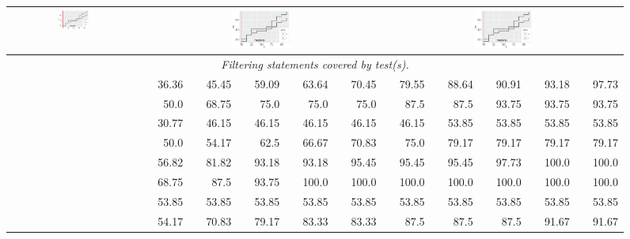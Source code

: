 \documentclass[sigplan,10pt,review,anonymous]{acmart}\settopmatter{printfolios=true,printccs=false,printacmref=false}
\begin{document}
\begin{figure}[!ht]
\begin{tabular}{cl|rrrrrrrrrr}
      \multicolumn{2}{c}{\includegraphics[width=0.25\textwidth]{R/mockito-allfailingtest.pdf}}
      &
      \multicolumn{5}{c}{\includegraphics[width=0.25\textwidth]{R/mockito-allfailingtest.pdf}}
      &
      \multicolumn{5}{c}{\includegraphics[width=0.25\textwidth]{R/mockito-allfailingtest.pdf}}\\
      \midrule

      \multicolumn{12}{c}{\emph{Filtering statements covered by test(s).}}\\
      \midrule
      \parbox[t]{2mm}{}
      & \lang{}     & 36.36 & 45.45 & 59.09 & 63.64 & 70.45  & 79.55 & 88.64 & 90.91 & 93.18 & 97.73 \\
      & \chart{}       & 50.0  & 68.75 & 75.0  & 75.0  & 75.0  & 87.5  & 87.5  & 93.75 & 93.75 & 93.75 \\
      & \jtime{}        & 30.77 & 46.15 & 46.15 & 46.15 & 46.15 & 46.15  & 53.85 & 53.85 & 53.85 & 53.85 \\
      & \mockito{} & 50.0  & 54.17 & 62.5  & 66.67 & 70.83 & 75.0  & 79.17 & 79.17 & 79.17 & 79.17 \\
      \hline
      \parbox[t]{2mm}{}
      & \lang{}     & 56.82 & 81.82 & 93.18 & 93.18 & 95.45  & 95.45 &95.45 & 97.73 & 100.0 & 100.0 \\
      & \chart{}       & 68.75 & 87.5  & 93.75 & 100.0 & 100.0 & 100.0 & 100.0 & 100.0 & 100.0 & 100.0 \\
      & \jtime{}        & 53.85 & 53.85 & 53.85 & 53.85 & 53.85 & 53.85  & 53.85 & 53.85 & 53.85 & 53.85 \\
      & \mockito{} & 54.17 & 70.83 & 79.17 & 83.33 & 83.33 & 87.5  & 87.5 & 87.5  & 91.67 & 91.67 \\
      \midrule


\end{tabular}
\end{figure}
\end{document}
